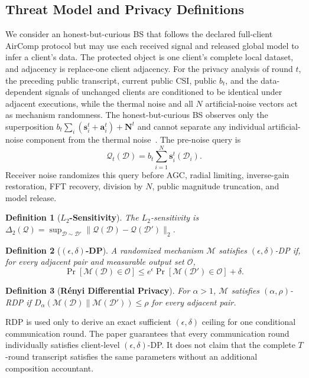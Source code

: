 \documentclass[journal]{IEEEtran}
\newtheorem{definition}{Definition}
\begin{document}
\subsection{Threat Model and Privacy Definitions}
We consider an honest-but-curious BS that follows the declared full-client AirComp protocol but may use each received signal and released global model to infer a client's data. The protected object is one client's complete local dataset, and adjacency is replace-one client adjacency. For the privacy analysis of round $t$, the preceding public transcript, current public CSI, public $b_t$, and the data-dependent signals of unchanged clients are conditioned to be identical under adjacent executions, while the thermal noise and all $N$ artificial-noise vectors act as mechanism randomness. The honest-but-curious BS observes only the superposition $b_t\sum_i(\mathbf s_i^t+\mathbf a_i^t)+\mathbf N^t$ and cannot separate any individual artificial-noise component from the thermal noise~\cite{liu2024mimo}. The pre-noise query is
\begin{equation}
 \mathcal Q_t(\mathcal D)=b_t\sum_{i=1}^{N}\mathbf s_i^t(\mathcal D_i).
 \label{eqn:privacy_query_system}
\end{equation}
Receiver noise randomizes this query before AGC, radial limiting, inverse-gain restoration, FFT recovery, division by $N$, public magnitude truncation, and model release.

\begin{definition}[\bf $L_2$-Sensitivity]
The $L_2$-sensitivity is $\Delta_2(\mathcal Q)=\sup_{\mathcal D\sim\mathcal D'}\|\mathcal Q(\mathcal D)-\mathcal Q(\mathcal D')\|_2$.
\end{definition}
\begin{definition}[\bf $(\epsilon,\delta)$-DP]
A randomized mechanism $\mathcal M$ satisfies $(\epsilon,\delta)$-DP if, for every adjacent pair and measurable output set $\mathcal O$,
\begin{equation}
 \Pr[\mathcal M(\mathcal D)\in\mathcal O]\le e^\epsilon\Pr[\mathcal M(\mathcal D')\in\mathcal O]+\delta.
\end{equation}
\end{definition}
\begin{definition}[\bf R\'enyi Differential Privacy]
For $\alpha>1$, $\mathcal M$ satisfies $(\alpha,\rho)$-RDP if $D_\alpha(\mathcal M(\mathcal D)\|\mathcal M(\mathcal D'))\le\rho$ for every adjacent pair.
\end{definition}
RDP is used only to derive an exact sufficient $(\epsilon,\delta)$ ceiling for one conditional communication round. The paper guarantees that every communication round individually satisfies client-level $(\epsilon,\delta)$-DP. It does not claim that the complete $T$-round transcript satisfies the same parameters without an additional composition accountant.
\end{document}
